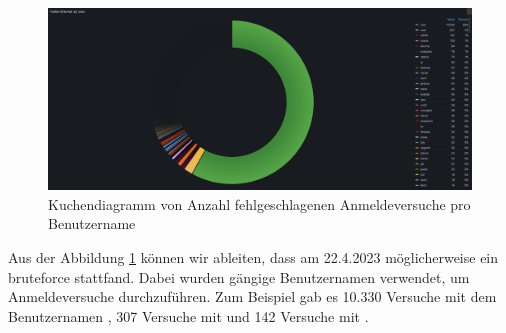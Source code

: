 \newpage
{}
\thispagestyle{lscape}
\begin{landscape}
    \begin{figure}[H]
        \centerline{\includegraphics[width=1.7\textwidth]{assets/Failed_pro_user.png}}
        \caption[Kuchendiagramm von Anzahl fehlgeschlagenen Anmeldeversuche pro Benutzername]
        {Kuchendiagramm von Anzahl fehlgeschlagenen Anmeldeversuche pro Benutzername}
        \label{fig:1_Anmeldung_BenutzerName}
        \centering
    \end{figure}
Aus der Abbildung \ref{fig:1_Anmeldung_BenutzerName} können wir ableiten, dass am 22.4.2023 möglicherweise ein \gls{bruteforce} stattfand. Dabei wurden gängige Benutzernamen verwendet, um Anmeldeversuche durchzuführen. Zum Beispiel gab es 10.330 Versuche mit dem Benutzernamen , 307 Versuche mit  und 142 Versuche mit .
\end{landscape}
\restoregeometry



